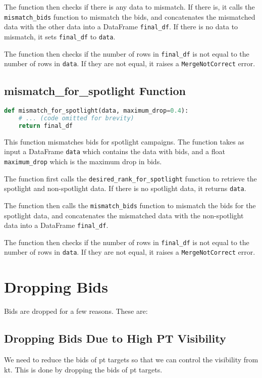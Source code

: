The function then checks if there is any data to mismatch. If there is, it calls the \verb|mismatch_bids| function to mismatch the bids, and concatenates the mismatched data with the other data into a DataFrame \verb|final_df|. If there is no data to mismatch, it sets \verb|final_df| to \verb|data|.

The function then checks if the number of rows in \verb|final_df| is not equal to the number of rows in \verb|data|. If they are not equal, it raises a \verb|MergeNotCorrect| error.

\subsection{mismatch\_for\_spotlight Function}

\begin{lstlisting}[language=Python]
def mismatch_for_spotlight(data, maximum_drop=0.4):
    # ... (code omitted for brevity)
    return final_df
\end{lstlisting}

This function mismatches bids for spotlight campaigns. The function takes as input a DataFrame \verb|data| which contains the data with bids, and a float \verb|maximum_drop| which is the maximum drop in bids.

The function first calls the \verb|desired_rank_for_spotlight| function to retrieve the spotlight and non-spotlight data. If there is no spotlight data, it returns \verb|data|.

The function then calls the \verb|mismatch_bids| function to mismatch the bids for the spotlight data, and concatenates the mismatched data with the non-spotlight data into a DataFrame \verb|final_df|.

The function then checks if the number of rows in \verb|final_df| is not equal to the number of rows in \verb|data|. If they are not equal, it raises a \verb|MergeNotCorrect| error.

\section{Dropping Bids}

Bids are dropped for a few reasons. These are:

\subsection{Dropping Bids Due to High PT Visibility}

We need to reduce the bids of pt targets so that we can control the visibility from kt. This is done by dropping the bids of pt targets.

